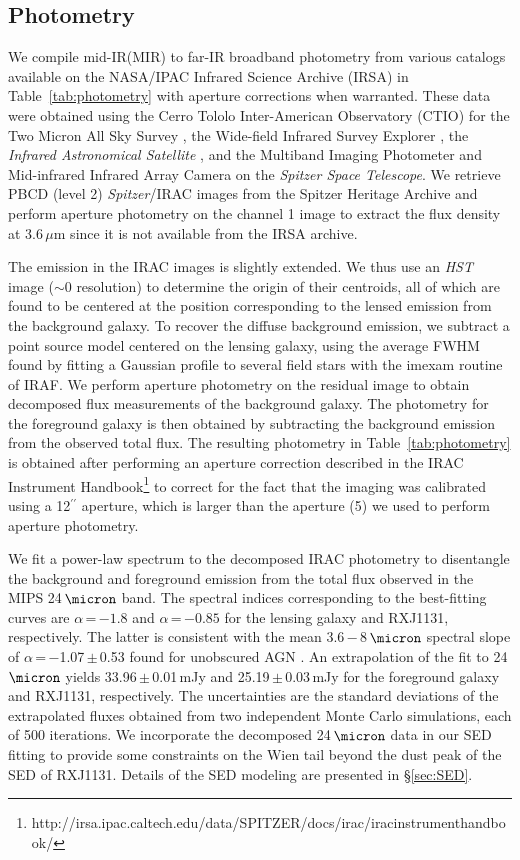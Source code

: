\documentclass[]{emulateapj}
\newcommand{\Tab}[1]{Table~\ref{tab:#1}}
\newcommand{\Sec}[1]{\S\ref{sec:#1}}
\def\spitzer {{\it Spitzer Space Telescope}\xspace}
\newcommand{\ncode}[1]{{\sc #1}}
\newcommand{\fir}{far-IR\xspace}
\newcommand{\mir}{mid-IR\xspace}
\begin{document}
\subsection{Photometry} \label{sec:photometry}
We compile \mir (MIR) to \fir broadband photometry from various
catalogs available on the NASA/IPAC Infrared Science
Archive (IRSA) in \Tab{photometry} with aperture corrections
when warranted. These data were obtained using
the Cerro Tololo Inter-American Observatory (CTIO) for the Two Micron All Sky Survey \citep[2MASS;][]{Skrutskie06a},
the Wide-field Infrared Survey Explorer \citep[{\it WISE};][]{Wright10a},
the {\it Infrared Astronomical Satellite}
\citep[{\it IRAS};][]{Neugebauer84a}, and
the Multiband Imaging Photometer \citep[MIPS;][]{Rieke04a} and
Mid-infrared Infrared Array Camera \citep[IRAC;][]{Fazio04a} on
the \spitzer.
We retrieve PBCD (level 2) {\it Spitzer}/IRAC images from the
Spitzer Heritage Archive and perform aperture photometry on
the channel 1 image to extract the flux density at 3.6\,$\mu$m
since it is not available from the IRSA archive.

The emission in the IRAC images is slightly extended. We thus use an
{\it HST} image ($\sim$0 resolution) to determine the
origin of their centroids, all of which are found to be
centered at the position corresponding to the lensed emission from the
background galaxy. To recover the diffuse background emission, we subtract a
point source model centered on the lensing galaxy, using the average
FWHM found by fitting a Gaussian profile to several field stars
with the \ncode{imexam} routine of IRAF.
We perform aperture photometry on the residual image
to obtain decomposed flux measurements of the background galaxy.
The photometry for the foreground galaxy is then obtained
by subtracting the background emission from the
observed total flux. The resulting photometry in
\Tab{photometry} is obtained after performing an aperture correction
described in the IRAC Instrument Handbook\footnote{http://irsa.ipac.caltech.edu/data/SPITZER/docs/irac/iracinstrumenthandbook/} to
correct for the fact that the imaging was calibrated
using a 12$^{\prime\prime}$ aperture, which is larger than the aperture (5) we used to
perform aperture photometry.

We fit a power-law spectrum to the
decomposed IRAC photometry to disentangle the background and foreground
emission from the total flux observed in the MIPS 24\,$\micron$ band.
The spectral indices corresponding to the best-fitting curves are $\alpha$\,=\,$-1.8$ and
$\alpha$\,=\,$-0.85$ for the lensing galaxy and RXJ1131, respectively.
The latter
is consistent with the mean 3.6\,$-$\,8\,$\micron$
spectral slope of
$\alpha$\,=\,$-$1.07\,$\pm$\,0.53 found for unobscured AGN
\citep{Stern05a}. An extrapolation of the fit to 24\,$\micron$
yields 33.96\,$\pm$\,0.01\,mJy and 25.19\,$\pm$\,0.03\,mJy
for the foreground galaxy and RXJ1131, respectively.
The uncertainties are the standard deviations of
the extrapolated fluxes obtained from two independent Monte Carlo
simulations, each of 500 iterations.
We incorporate the decomposed 24\,$\micron$ data in our
SED fitting to provide some constraints on
the Wien tail beyond the dust peak
of the SED of RXJ1131.
Details of the SED modeling are presented in \Sec{SED}.
\end{document}
